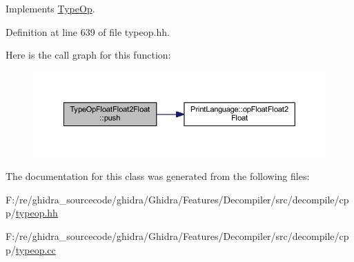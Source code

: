 Implements \mbox{\hyperlink{class_type_op_ac9c9544203ed74dabe6ac662b653b2af}{Type\+Op}}.



Definition at line 639 of file typeop.\+hh.

Here is the call graph for this function\+:
\nopagebreak
\begin{figure}[H]
\begin{center}
\leavevmode
\includegraphics[width=350pt]{class_type_op_float_float2_float_a811e99c5160578b92050d6bc8900ed8a_cgraph}
\end{center}
\end{figure}


The documentation for this class was generated from the following files\+:\begin{DoxyCompactItemize}
\item 
F\+:/re/ghidra\+\_\+sourcecode/ghidra/\+Ghidra/\+Features/\+Decompiler/src/decompile/cpp/\mbox{\hyperlink{typeop_8hh}{typeop.\+hh}}\item 
F\+:/re/ghidra\+\_\+sourcecode/ghidra/\+Ghidra/\+Features/\+Decompiler/src/decompile/cpp/\mbox{\hyperlink{typeop_8cc}{typeop.\+cc}}\end{DoxyCompactItemize}
